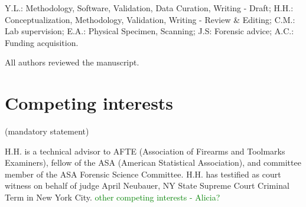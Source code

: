 \documentclass[fleqn,10pt]{wlscirep}
\newcommand{\hh}[1]{{\textcolor{Green}{#1}}}
\begin{document}
Y.L.: Methodology, Software, Validation, Data Curation, Writing - Draft;
H.H.: Conceptualization, Methodology, Validation, Writing - Review \&
Editing; C.M.: Lab supervision; E.A.: Physical Specimen, Scanning; J.S:
Forensic advice; A.C.: Funding acquisition.

\noindent
All authors reviewed the manuscript. 

\section*{Competing interests} (mandatory statement)

H.H. is a technical advisor to AFTE (Association of Firearms and
Toolmarks Examiners), fellow of the ASA (American Statistical
Association), and committee member of the ASA Forensic Science
Committee. H.H. has testified as court witness on behalf of judge April
Neubauer, NY State Supreme Court Criminal Term in New York City.
\hh{other competing interests - Alicia?}
\end{document}
